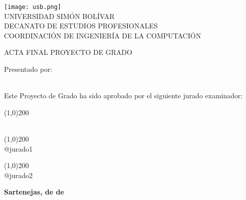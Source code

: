 \begin{titlepage}
\begin{center}

\texttt{[image: usb.png]} \\

\textsc {\large UNIVERSIDAD SIMÓN BOLÍVAR} \\
\textsc{DECANATO DE ESTUDIOS PROFESIONALES\\
COORDINACIÓN DE INGENIERÍA DE LA COMPUTACIÓN}

\bigskip
\bigskip
\bigskip
\bigskip
\bigskip
\bigskip

\textsc{ACTA FINAL PROYECTO DE GRADO}

\bigskip
\bigskip

\textsc{\textbf{\projectTitle}}

\bigskip
\bigskip
\bigskip
\bigskip

\begin{minipage}{\textwidth}
\centering
Presentado por: \\
\textsc{\textbf{\authorName}} \\

\bigskip
\bigskip
\bigskip

Este Proyecto de Grado ha sido aprobado por el siguiente jurado examinador: \\

\bigskip
\bigskip

\line(1,0){200} \\
\tutorName \\

\bigskip
\bigskip

\line(1,0){200} \\
@jurado1\\

\bigskip
\bigskip

\line(1,0){200} \\
@jurado2\\
\end{minipage}

\bigskip
\bigskip
\vfill

{\large \bfseries Sartenejas, \presentD de \presentM de \presentY}

\end{center}
\end{titlepage}
